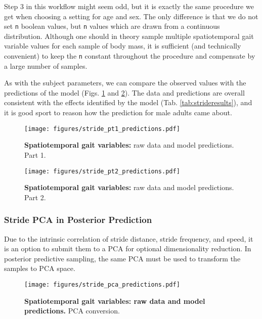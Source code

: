 Step 3 in this workflow might seem odd, but it is exactly the same procedure we get when choosing a setting for age and sex.
The only difference is that we do not set \texttt{n} boolean values, but \texttt{n} values which are drawn from a continuous distribution.
Although one should in theory sample multiple spatiotemporal gait variable values for each sample of body mass, it is sufficient (and technically convenient) to keep the \texttt{n} constant throughout the procedure and compensate by a large number of samples.


As with the subject parameters, we can compare the observed values with the predictions of the model (Figs. \ref{fig:stride1} and \ref{fig:stride2}).
The data and predictions are overall consistent with the effects identified by the model (Tab. \ref{tab:strideresults}), and it is good sport to reason how the prediction for male adults came about.


\begin{figure}[p]
\centering
\texttt{[image: figures/stride\_pt1\_predictions.pdf]}
\caption{\label{fig:stride1}\textbf{Spatiotemporal gait variables:} raw data and model predictions. Part 1.}
\end{figure}

\begin{figure}[p]
\centering
\texttt{[image: figures/stride\_pt2\_predictions.pdf]}
\caption{\label{fig:stride2}\textbf{Spatiotemporal gait variables:} raw data and model predictions. Part 2.}
\end{figure}



\subsubsection{Stride PCA in Posterior Prediction}
\label{sec:org82b0840}
Due to the intrinsic correlation of stride distance, stride frequency, and speed, it is an option to submit them to a PCA for optional dimensionality reduction.
In posterior predictive sampling, the same PCA must be used to transform the samples to PCA space.

\begin{figure}[p]
\centering
\texttt{[image: figures/stride\_pca\_predictions.pdf]}
\caption{\label{fig:stridepca}\textbf{Spatiotemporal gait variables: raw data and model predictions.} PCA conversion.}
\end{figure}



